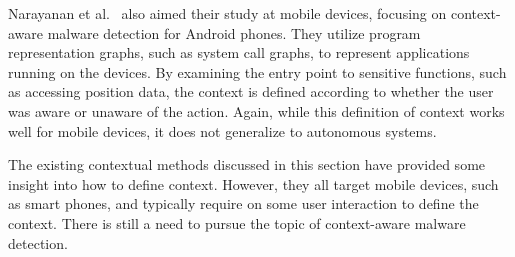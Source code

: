 \documentclass[../stegner_thesis.tex]{subfiles}
\begin{document}
\par Narayanan et al.~\cite{narayananContextawareAdaptive2017} also aimed their
study at mobile devices, focusing on context-aware malware detection for
Android phones.
They utilize program representation graphs, such as system call graphs, to
represent applications running on the devices.
By examining the entry point to sensitive functions, such as accessing position
data, the context is defined according to whether the user was aware or unaware
of the action.
Again, while this definition of context works well for mobile devices, it does
not generalize to autonomous systems.

\par The existing contextual methods discussed in this section have provided
some insight into how to define context.
However, they all target mobile devices, such as smart phones, and typically
require on some user interaction to define the context.
There is still a need to pursue the topic of context-aware malware detection.

\newpage
\end{document}
